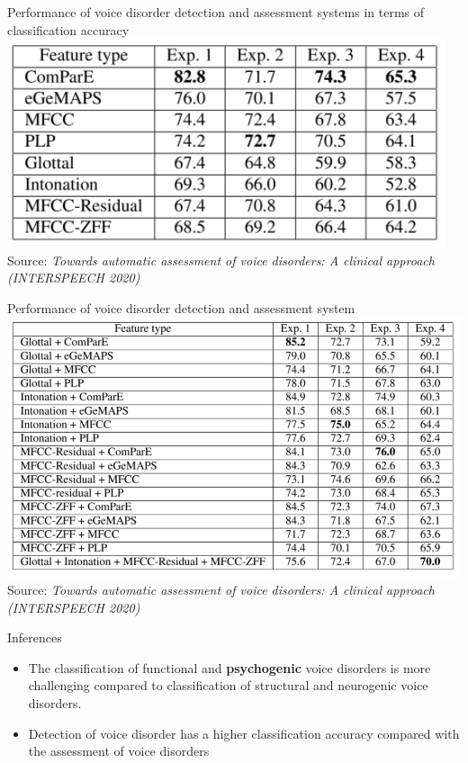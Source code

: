 \documentclass{beamer}
\begin{document}
\begin{frame}{\small Performance of voice disorder detection and assessment systems in terms of classification accuracy}
\centering
    \includegraphics[width=\textwidth]{Feature wrt exp2.PNG}
    \\\tiny Source: \textit{Towards automatic assessment of voice disorders: A clinical approach (INTERSPEECH 2020)}
\end{frame}
\begin{frame}{Performance of voice disorder detection and assessment system}
\centering
    \includegraphics[width=\textwidth]{Feature wrt exp.PNG}
    \\\tiny Source: \textit{Towards automatic assessment of voice disorders: A clinical approach (INTERSPEECH 2020)}
\end{frame}
\begin{frame}{Inferences}
\begin{itemize}
    \item The classification of functional and \textbf{psychogenic} voice disorders is more challenging compared to classification of structural and neurogenic voice disorders. 
    \item Detection of voice disorder has a higher classification accuracy compared with the assessment of voice disorders
\end{itemize}
    
\end{frame}
\end{document}
